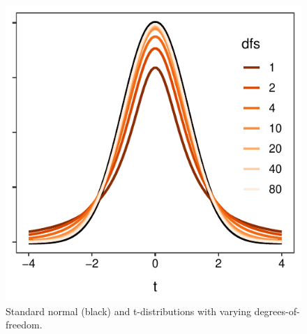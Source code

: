 \documentclass[10pt,openany]{book}\usepackage[]{graphicx}\usepackage[]{color}
\newenvironment{knitrout}{}{} %
\begin{document}
\begin{knitrout}
\color{fgcolor}\begin{figure}[hbtp]

{\centering \includegraphics[width=.4\linewidth]{Figs/tvsZ-1} 

}

\caption[Standard normal (black) and t-distributions with varying degrees-of-freedom]{Standard normal (black) and t-distributions with varying degrees-of-freedom.}\label{fig:tvsZ}
\end{figure}


\end{knitrout}
\end{document}
